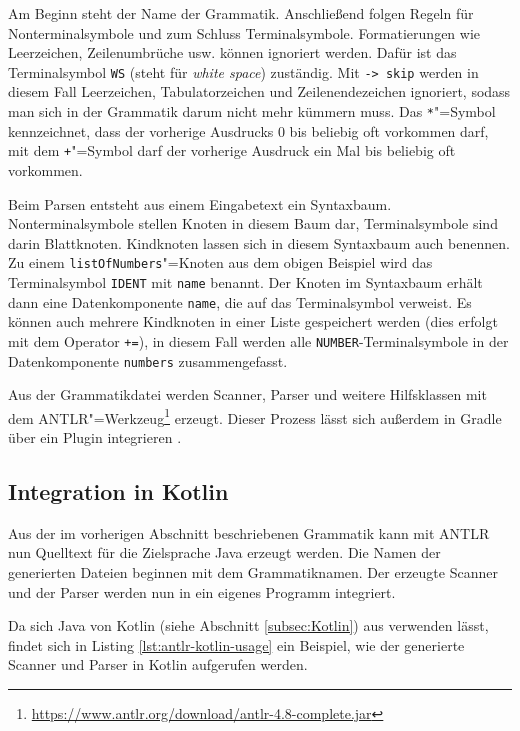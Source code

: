 Am Beginn steht der Name der Grammatik. Anschließend folgen Regeln für Nonterminalsymbole und zum Schluss Terminalsymbole. Formatierungen wie Leerzeichen, Zeilenumbrüche usw. können ignoriert werden. Dafür ist das Terminalsymbol \lstinline{WS} (steht für \emph{white space}) zuständig. Mit \lstinline{-> skip} werden in diesem Fall Leerzeichen, Tabulatorzeichen und Zeilenendezeichen ignoriert, sodass man sich in der Grammatik darum nicht mehr kümmern muss. Das \lstinline{*}"=Symbol kennzeichnet, dass der vorherige Ausdrucks $0$ bis beliebig oft vorkommen darf, mit dem \lstinline{+}"=Symbol darf der vorherige Ausdruck ein Mal bis beliebig oft vorkommen.

\pagebreak
Beim Parsen entsteht aus einem Eingabetext ein Syntaxbaum. Nonterminalsymbole stellen Knoten in diesem Baum dar, Terminalsymbole sind darin Blattknoten. Kindknoten lassen sich in diesem Syntaxbaum auch benennen. Zu einem \lstinline{listOfNumbers}"=Knoten aus dem obigen Beispiel wird das Terminalsymbol \lstinline{IDENT} mit \lstinline{name} benannt. Der Knoten im Syntaxbaum erhält dann eine Datenkomponente \lstinline{name}, die auf das Terminalsymbol verweist. Es können auch mehrere Kindknoten in einer Liste gespeichert werden (dies erfolgt mit dem Operator \lstinline{+=}), in diesem Fall werden alle \lstinline{NUMBER}-Terminalsymbole in der Datenkomponente \lstinline{numbers} zusammengefasst.

Aus der Grammatikdatei werden Scanner, Parser und weitere Hilfsklassen mit dem ANTLR"=Werkzeug\footnote{\url{https://www.antlr.org/download/antlr-4.8-complete.jar}} erzeugt. Dieser Prozess lässt sich außerdem in Gradle über ein Plugin integrieren \cite{GradleANTLRPlugin}.

\subsection{Integration in Kotlin}

Aus der im vorherigen Abschnitt beschriebenen Grammatik kann mit ANTLR nun Quelltext für die Zielsprache Java erzeugt werden. Die Namen der generierten Dateien beginnen mit dem Grammatiknamen. Der erzeugte Scanner und der Parser werden nun in ein eigenes Programm integriert.

Da sich Java von Kotlin (siehe Abschnitt \ref{subsec:Kotlin}) aus verwenden lässt, findet sich in Listing \ref{lst:antlr-kotlin-usage} ein Beispiel, wie der generierte Scanner und Parser in Kotlin aufgerufen werden. 



